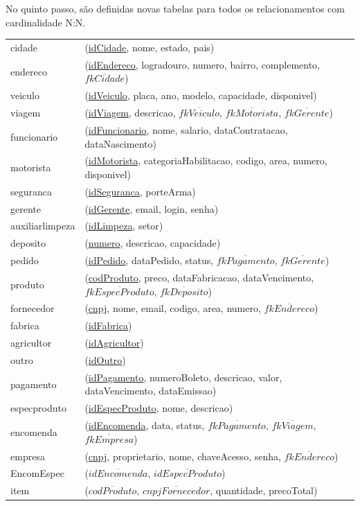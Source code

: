 \documentclass[12pt, onecolumn, titlepage]{article}
\begin{document}
No quinto passo, são definidas novas tabelas para todos os relacionamentos com cardinalidade N:N.

\begin{table}[htb!]
\begin{center}
\begin{tabular}{p{2.5cm} p{10.5cm}}
cidade & (\underline{idCidade}, nome, estado, pais) \\
endereco & (\underline{idEndereco}, logradouro, numero, bairro, complemento, $\overline{fkCidade}$) \\
veiculo & (\underline{idVeiculo}, placa, ano, modelo, capacidade, disponivel) \\
viagem & (\underline{idViagem}, descricao, $\overline{fkVeiculo}$, $\overline{fkMotorista}$, $\overline{fkGerente}$) \\
funcionario & (\underline{idFuncionario}, nome, salario, dataContratacao, dataNascimento)\\
motorista & (\underline{idMotorista}, categoriaHabilitacao, codigo, area, numero, disponivel)\\
seguranca & (\underline{idSeguranca}, porteArma)\\
gerente & (\underline{idGerente}, email, login, senha)\\
auxiliarlimpeza & (\underline{idLimpeza}, setor)\\
deposito & (\underline{numero}, descricao, capacidade)\\
pedido & (\underline{idPedido}, dataPedido, status, $\overline{fkPagamento}$, $\overline{fkGerente}$)\\
produto & (\underline{codProduto}, preco, dataFabricacao, dataVencimento, $\overline{fkEspecProduto}$, $\overline{fkDeposito}$)\\
fornecedor & (\underline{cnpj}, nome, email, codigo, area, numero, $\overline{fkEndereco}$)\\
fabrica & (\underline{idFabrica})\\
agricultor & (\underline{idAgricultor})\\
outro & (\underline{idOutro})\\
pagamento & (\underline{idPagamento}, numeroBoleto, descricao, valor, dataVencimento, dataEmissao)\\
especproduto & (\underline{idEspecProduto}, nome, descricao)\\
encomenda & (\underline{idEncomenda}, data, status, $\overline{fkPagamento}$, $\overline{fkViagem}$, $\overline{fkEmpresa}$)\\
empresa & (\underline{cnpj}, proprietario, nome, chaveAcesso, senha, $\overline{fkEndereco}$)\\
EncomEspec & (\underline{$\overline{idEncomenda}$}, \underline{$\overline{idEspecProduto}$})\\
item & (\underline{$\overline{codProduto}$}, \underline{$\overline{cnpjFornecedor}$}, quantidade, precoTotal)
\end{tabular}
\end{center}
\end{table}
\end{document}
